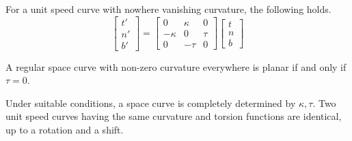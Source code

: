 \documentclass[11pt]{article}
\theoremstyle{definition}
\theoremstyle{remark}
\numberwithin{equation}{section}
\begin{document}
    \begin{theorem}
        For a unit speed curve with nowhere vanishing curvature, the following holds.
        \[
            \begin{bmatrix}
                t' \\ n' \\ b'
            \end{bmatrix} = \begin{bmatrix}
                0 & \kappa & 0 \\
                -\kappa  & 0 & \tau \\
                0 & -\tau & 0 
            \end{bmatrix} \begin{bmatrix}
                t \\ n \\ b
            \end{bmatrix}
        \]
    \end{theorem}
    \begin{corollary}
        A regular space curve with non-zero curvature everywhere is planar if and
        only if $\tau = 0$.
    \end{corollary}
    \begin{corollary}
        Under suitable conditions, a space curve is completely determined by $\kappa,
        \tau$. Two unit speed curves having the same curvature and torsion functions
        are identical, up to a rotation and a shift.
    \end{corollary}
\end{document}
